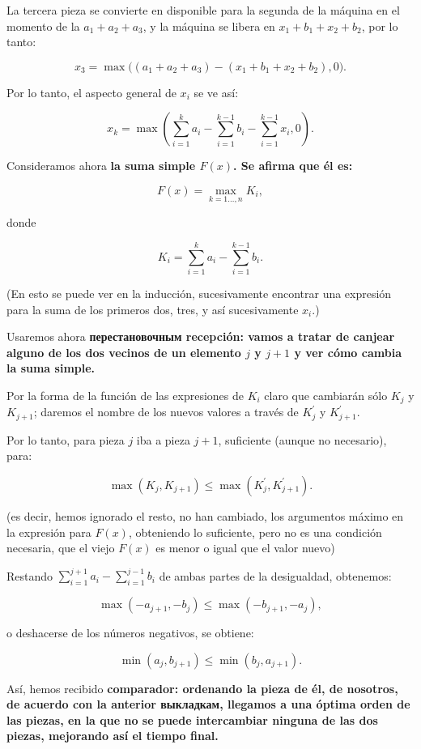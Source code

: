 La tercera pieza se convierte en disponible para la segunda de la máquina en el momento de la $a_1+a_2+a_3$, y la máquina se libera en $x_1+b_1+x_2+b_2$, por lo tanto:

$$ x_3 = \max \Big( (a_1+a_2+a_3) - (x_1+b_1+x_2+b_2), 0 \Big). $$

Por lo tanto, el aspecto general de $x_i$ se ve así:

$$ x_k = \max \left( \sum_{i=1}^{k} a_i - \sum_{i=1}^{k-1} b_i - \sum_{i=1}^{k-1} x_i, 0 \right). $$

Consideramos ahora \bf{la suma simple} $F(x)$. Se afirma que él es:

$$ F(x) = \max_{k=1 \ldots, n} K_i, $$

donde

$$ K_i = \sum_{i=1}^{k} a_i - \sum_{i=1}^{k-1} b_i. $$

(En esto se puede ver en la inducción, sucesivamente encontrar una expresión para la suma de los primeros dos, tres, y así sucesivamente $x_i$.)

Usaremos ahora \bf{перестановочным recepción}: vamos a tratar de canjear alguno de los dos vecinos de un elemento $j$ y $j+1$ y ver cómo cambia la suma simple.

Por la forma de la función de las expresiones de $K_i$ claro que cambiarán sólo $K_j$ y $K_{j+1}$; daremos el nombre de los nuevos valores a través de $K_j^\prime$ y $K_{j+1}^\prime$.

Por lo tanto, para pieza $j$ iba a pieza $j+1$, suficiente (aunque no necesario), para:

$$ \max \left( K_j, K_{j+1} \right) \le \max \left( K_j^\prime, K_{j+1}^\prime \right). $$

(es decir, hemos ignorado el resto, no han cambiado, los argumentos máximo en la expresión para $F(x)$, obteniendo lo suficiente, pero no es una condición necesaria, que el viejo $F(x)$ es menor o igual que el valor nuevo)

Restando $ \sum_{i=1}^{j+1} a_i - \sum_{i=1}^{j-1} b_i $ de ambas partes de la desigualdad, obtenemos:

$$ \max (-a_{j+1}, -b_j) \le \max (-b_{j+1}, -a_j), $$

o deshacerse de los números negativos, se obtiene:

$$ \min (a_j, b_{j+1}) \le \min (b_j, a_{j+1}). $$

Así, hemos recibido \bf{comparador}: ordenando la pieza de él, de nosotros, de acuerdo con la anterior выкладкам, llegamos a una óptima orden de las piezas, en la que no se puede intercambiar ninguna de las dos piezas, mejorando así el tiempo final.

